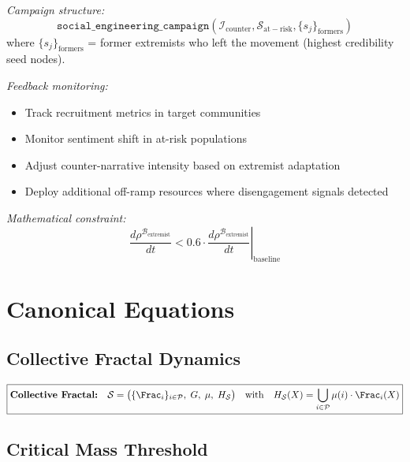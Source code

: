 \begin{tcolorbox}[colback=yellow!5!white,colframe=yellow!65!black,title=\textbf{Real-Life Scenarios: Social Engineering Applications},breakable]
\textit{Campaign structure:}
\[
    \mathtt{social\_engineering\_campaign}(\mathcal{I}_{\mathrm{counter}}, \mathcal{S}_{\mathrm{at-risk}}, \{s_j\}_{\mathrm{formers}})
\]
where $\{s_j\}_{\mathrm{formers}}$ = former extremists who left the movement (highest credibility seed nodes).

\textit{Feedback monitoring:}
\begin{itemize}
    \item Track recruitment metrics in target communities
    \item Monitor sentiment shift in at-risk populations
    \item Adjust counter-narrative intensity based on extremist adaptation
    \item Deploy additional off-ramp resources where disengagement signals detected
\end{itemize}

\textit{Mathematical constraint:}
\[
    \frac{d\rho^{\mathcal{B}_{\mathrm{extremist}}}}{dt} < 0.6 \cdot \left.\frac{d\rho^{\mathcal{B}_{\mathrm{extremist}}}}{dt}\right|_{\mathrm{baseline}}
\]

\end{tcolorbox}

\section{Canonical Equations}
\label{sec:se-canonical-equations}

\subsection{Collective Fractal Dynamics}

\begin{equation}
\boxed{
    \textbf{Collective Fractal:} \quad
    \mathcal{S} = \bigl( \{\Frac_i\}_{i \in \mathcal{P}}, \; G, \; \mu, \; H_{\mathcal{S}} \bigr)
    \quad \text{with} \quad
    H_{\mathcal{S}}(X) = \bigcup_{i \in \mathcal{P}} \mu(i) \cdot \Frac_i(X)
}
\label{eq:collective-fractal}
\end{equation}

\subsection{Critical Mass Threshold}

